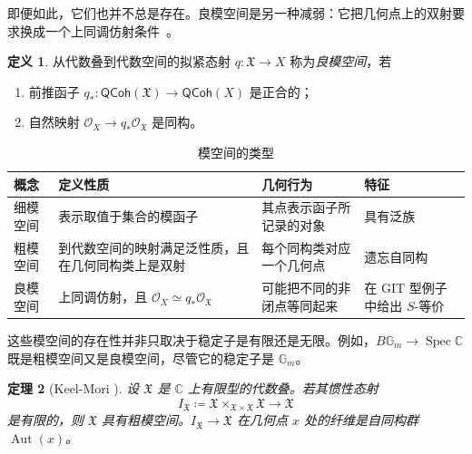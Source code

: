 \documentclass{amsart}
\newtheorem{thm}{定理}[section]
\theoremstyle{definition}
\newtheorem{defn}[thm]{定义}
\theoremstyle{remark}
\theoremstyle{plain}
\theoremstyle{definition}
\theoremstyle{remark}
\newcommand{\G}{\mathbb{G}}
\newcommand{\C}{\mathbb{C}}
\newcommand{\mc}[1]{\mathcal{#1}}
\newcommand{\mf}[1]{\mathfrak{#1}}
\newcommand{\on}[1]{\operatorname{#1}}
\newcommand{\ms}[1]{\mathsf{#1}}
\newcommand{\1}{\mathbf{1}}
\newcommand{\2}{\mathbf{2}}
\newcommand{\3}{\mathbf{3}}
\begin{document}
即便如此，它们也并不总是存在。良模空间是另一种减弱：它把几何点上的双射要求换成一个上同调仿射条件~\cite{Alper2013}。

\begin{defn}
    从代数叠到代数空间的拟紧态射 \(q\colon\mf{X}\to X\) 称为\textit{良模空间}，若
    \begin{enumerate}
        \item 前推函子 \(q_*\colon\ms{QCoh}(\mf{X})\to\ms{QCoh}(X)\) 是正合的；
        \item 自然映射 \(\mc{O}_X\to q_*\mc{O}_{\mf{X}}\) 是同构。
    \end{enumerate}
\end{defn}

\begin{table}[htpb]
    \centering
    \caption{模空间的类型}
    \label{tab:moduli-types-corrected}
    \renewcommand{\arraystretch}{1.3}
    \begin{tabular}{
        p{}
        p{}
        p{}
        p{}
    }
        \toprule
        \textbf{概念}
        & \textbf{定义性质}
        & \textbf{几何行为}
        & \textbf{特征}
        \\
        \midrule
        细模空间
        & 表示取值于集合的模函子
        & 其点表示函子所记录的对象
        & 具有泛族
        \\
        粗模空间
        & 到代数空间的映射满足泛性质，且在几何同构类上是双射
        & 每个同构类对应一个几何点
        & 遗忘自同构
        \\
        良模空间
        & 上同调仿射，且
          \(\mc{O}_X \simeq q_*\mc{O}_{\mf{X}}\)
        & 可能把不同的非闭点等同起来
        & 在 GIT 型例子中给出 \(S\)-等价
        \\
        \bottomrule
    \end{tabular}
\end{table}

这些模空间的存在性并非只取决于稳定子是有限还是无限。例如，\(B\G_m\to\on{Spec}\C\) 既是粗模空间又是良模空间，尽管它的稳定子是 \(\G_m\)。

\begin{thm}[Keel-Mori {\cite{KeelMori1997}}]
    设 \(\mf{X}\) 是 \(\C\) 上有限型的代数叠。若其惯性态射
    \[
        I_{\mf{X}}
        \coloneqq
        \mf{X}\times_{\mf{X}\times\mf{X}}\mf{X}
        \longrightarrow \mf{X}
    \]
    是有限的，则 \(\mf{X}\) 具有粗模空间。\(I_{\mf{X}}\to\mf{X}\) 在几何点 \(x\) 处的纤维是自同构群 \(\on{Aut}(x)\)。
\end{thm}
\end{document}
